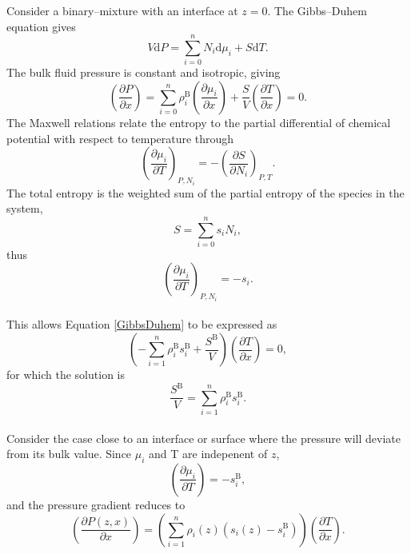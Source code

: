 Consider a binary--mixture with an interface at $z=0$.
The Gibbs--Duhem equation gives
\begin{equation}
V \mathrm{d}P = \sum_{i=0}^{n} N_{i} \mathrm{d}\mu_{i} + S \mathrm{d}T.
\end{equation}
The bulk fluid pressure is constant and isotropic, giving
\begin{equation}
\label{GibbsDuhem}
\left( \frac{\partial P}{\partial x}\right) = \sum_{i=0}^{n} \rho_{i}^{\mathrm{B}} \left(\frac{\partial \mu_{i}}{\partial x}\right) + \frac{S}{V} \left( \frac{\partial T}{\partial x}\right) = 0.
\end{equation}
The Maxwell relations relate the entropy to the partial differential of chemical potential with respect to temperature through
\begin{equation}
\left( \frac{\partial\mu_{i}}{\partial T} \right)_{P,N_{i}} = - \left(\frac{\partial S}{\partial N_{i}}\right)_{P,T}.
\end{equation}
The total entropy is the weighted sum of the partial entropy of the species in the system, 
\begin{equation}
S = \sum_{i=0}^{n}s_{i}N_{i},
\end{equation}
thus
\begin{equation}
\left( \frac{\partial\mu_{i}}{\partial T} \right)_{P,N_{i}} = - s_{i}.
\end{equation}
\\
This allows Equation \ref{GibbsDuhem} to be expressed as
\begin{equation}
\left( - \sum_{i=1}^{n}\rho_{i}^{\mathrm{B}}s_{i}^{\mathrm{B}}+\frac{S^{\mathrm{B}}}{V}\right)\left(\frac{\partial T}{\partial x}\right) = 0,
\end{equation}
for which the solution is 
\begin{equation}
\frac{S^{\mathrm{B}}}{V} = \sum_{i=1}^{n}\rho_{i}^{\mathrm{B}}s_{i}^{\mathrm{B}}.
\end{equation}
\\
Consider the case close to an interface or surface where the pressure will deviate from its bulk value.
Since $\mu_{i}$ and T are indepenent of $z$,
\begin{equation}
\left(\frac{\partial \mu_{i}}{\partial T}\right) = - s_{i}^{\mathrm{B}},
\end{equation}
and the pressure gradient reduces to
\begin{equation}
\left(\frac{\partial P(z,x)}{\partial x}\right) = \left(\sum_{i=1}^{n}\rho_{i}(z)\left(s_{i}(z)-s_{i}^{\mathrm{B}}\right)\right)\left(\frac{\partial T}{\partial x}\right).
\label{PressGrad}
\end{equation}

